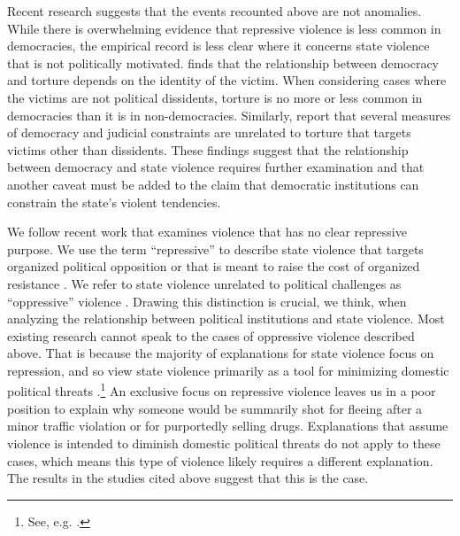 \documentclass[11pt]{article}
\begin{document}
Recent research suggests that the events recounted above are not anomalies. While there is overwhelming evidence that repressive violence is less common in democracies, the empirical record is less clear where it concerns state violence that is not politically motivated. \citet{Haschke2018} finds that the relationship between democracy and torture depends on the identity of the victim. When considering cases where the victims are not political dissidents, torture is no more or less common in democracies than it is in non-democracies. Similarly, \citet{JacksonHillHall2018} report that several measures of democracy and judicial constraints are unrelated to torture that targets victims other than dissidents. These findings suggest that the relationship between democracy and state violence requires further examination and that another caveat must be added to the claim that democratic institutions can constrain the state's violent tendencies.     
   
We follow recent work that examines violence that has no clear repressive purpose. We use the term ``repressive'' to describe state violence that targets organized political opposition or that is meant to raise the cost of organized resistance \citep{Bisselletal1978,Tilly1978, Goldstein1978, StohlLopez1984,Davenport2007AR}. We refer to state violence unrelated to political challenges as ``oppressive'' violence \citep{Bisselletal1978}. Drawing this distinction is crucial, we think, when analyzing the relationship between political institutions and state violence. Most existing research cannot speak to the cases of oppressive violence described above. That is because the majority of explanations for state violence focus on repression, and so view state violence primarily as a tool for minimizing domestic political threats \citep{Haschke2018}.\footnote{See, e.g. \cite{Davenport1995,Poe2004,Pierskalla2010,Ritter2014,RitterConrad2016}.} An exclusive focus on repressive violence leaves us in a poor position to explain why someone would be summarily shot for fleeing after a minor traffic violation or for purportedly selling drugs. 
Explanations that assume violence is intended to diminish domestic political threats do not apply to these cases, which means this type of violence likely requires a different explanation. The results in the studies cited above suggest that this is the case.  
\end{document}

